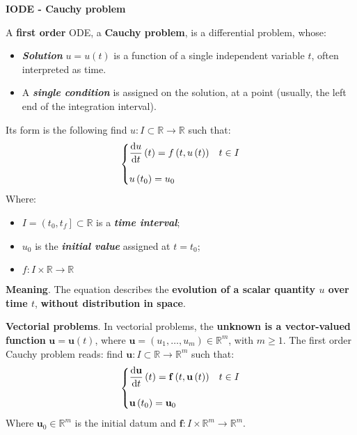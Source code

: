 \highspace
\begin{flushleft}
    \textcolor{Green3}{ \textbf{I\textdegree ODE - Cauchy problem}}
\end{flushleft}
A \textbf{first order} ODE, a \textbf{Cauchy problem}, is a differential problem, whose:
\begin{itemize}
    \item \textbf{\emph{Solution}} $u = u\left(t\right)$ is a function of a single independent variable $t$, often interpreted as time.
    \item A \textbf{\emph{single condition}} is assigned on the solution, at a point (usually, the left end of the integration interval).
\end{itemize}
Its form is the following find $u : I \subset \mathbb{R} \rightarrow \mathbb{R}$ such that:
\begin{equation}
    \begin{cases}
        \dfrac{\mathrm{d}u}{\mathrm{d}t}\left(t\right) = f\left(t, u\left(t\right)\right) & t \in I \vspace{1em} \\
        u\left(t_{0}\right) = u_{0}
    \end{cases}
\end{equation}
Where:
\begin{itemize}
    \item $I = \left( t_{0}, t_{f} \right] \subset \mathbb{R}$ is a \emph{\textbf{time interval}};
    \item $u_{0}$ is the \emph{\textbf{initial value}} assigned at $t = t_{0}$;
    \item $f: I \times \mathbb{R} \rightarrow \mathbb{R}$
\end{itemize}
\textcolor{Green3}{ \textbf{Meaning}}. The equation describes the \textbf{evolution of a scalar quantity $u$ over time $t$}, \textbf{without distribution in space}.

\highspace
\textcolor{Green3}{ \textbf{Vectorial problems}}. In vectorial problems, the \textbf{unknown is a vector-valued function} $\mathbf{u} = \mathbf{u}\left(t\right)$, where $\mathbf{u} = \left(u_{1}, \dots, u_{m}\right) \in \mathbb{R}^{m}$, with $m \ge 1$. The first order Cauchy problem reads: find $\mathbf{u} : I \subset \mathbb{R} \rightarrow \mathbb{R}^{m}$ such that:
\begin{equation*}
    \begin{cases}
        \dfrac{\mathrm{d}\mathbf{u}}{\mathrm{d}t}\left(t\right) = \mathbf{f}\left(t, \mathbf{u}\left(t\right)\right) & t \in I \vspace{1em} \\
        \mathbf{u}\left(t_{0}\right) = \mathbf{u}_{0}
    \end{cases}
\end{equation*}
Where $\mathbf{u}_{0} \in \mathbb{R}^{m}$ is the initial datum and $\mathbf{f}: I \times \mathbb{R}^{m} \rightarrow \mathbb{R}^{m}$.

